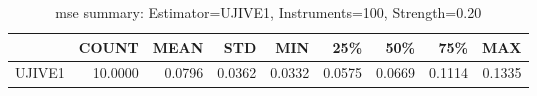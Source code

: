 \begin{table}[ht]
\centering
\caption{mse summary: Estimator=UJIVE1, Instruments=100, Strength=0.20}
\begin{tabular}{lrrrrrrrr}
\toprule
 & COUNT & MEAN & STD & MIN & 25\% & 50\% & 75\% & MAX \\
\midrule
UJIVE1 & 10.0000 & 0.0796 & 0.0362 & 0.0332 & 0.0575 & 0.0669 & 0.1114 & 0.1335 \\
\bottomrule
\end{tabular}
\end{table}
